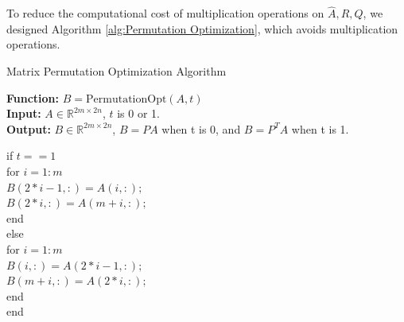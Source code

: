\documentclass[5p,10pt]{elsarticle}
\numberwithin{equation}{section}
\begin{document}
To reduce the computational cost of multiplication operations on $\hat{A}, R, Q$, we designed Algorithm \ref{alg:Permutation Optimization}, which avoids multiplication operations.
\linespread{1.1}
    \begin{algorithm}[htbp]
    \caption{Matrix Permutation Optimization Algorithm}
    \label{alg:Permutation Optimization}
    \textbf{Function:} $B=\text{PermutationOpt}(A,t)$\\
    \textbf{Input:} \indent  $ A\in \mathbb{R}^{2m\times 2n}$, $t$ is 0 or 1. \\
    {\textbf{Output:}}  $B \in\mathbb{R}^{2m\times 2n}$, $B=PA$ when t is 0, and $B=P^TA$ when t is 1.
          \begin{algorithmic}
          \raggedright 
          \item[] if $t == 1$\\
          \quad for $i = 1:m$\\
          \qquad $B(2*i-1, :) = A(i, :);$\\
          \qquad $B(2*i, :) = A(m+i, :);$\\
          \quad end\\
          \noindent else\\
          \quad for $i = 1:m$\\
          \qquad $B(i, :) = A(2*i-1, :);$\\
          \qquad $B(m+i, :) = A(2*i, :);$\\
          \quad end\\
          end
          \end{algorithmic}
\end{algorithm}
\end{document}
